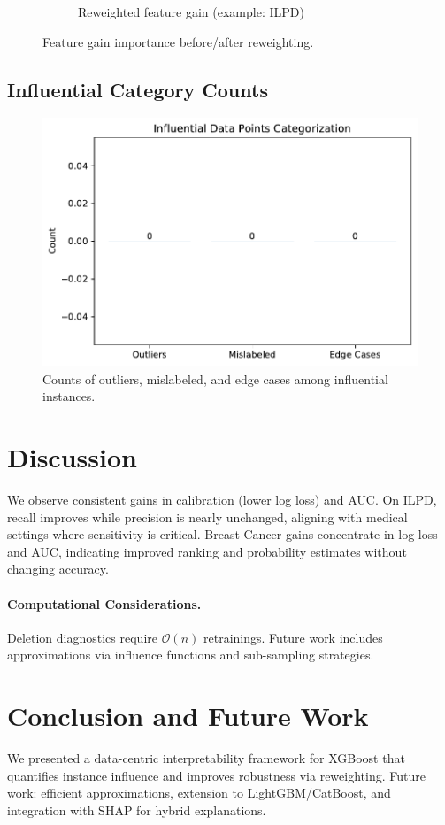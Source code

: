 \documentclass[sn-basic]{sn-jnl} %
\begin{document}
\begin{figure}[H]
\begin{subfigure}{.49\linewidth}
    \caption{Reweighted feature gain (example: ILPD)}
  \end{subfigure}
  \caption{Feature gain importance before/after reweighting.}
  \label{fig:featgain}
\end{figure}

\subsection{Influential Category Counts}
\begin{figure}[H]
  \centering
  \includegraphics[width=.7\linewidth]{fig_category_counts.pdf}
  \caption{Counts of outliers, mislabeled, and edge cases among influential instances.}
  \label{fig:cats}
\end{figure}

\section{Discussion}
We observe consistent gains in calibration (lower log loss) and AUC. On ILPD, recall improves while precision is nearly unchanged, aligning with medical settings where sensitivity is critical. Breast Cancer gains concentrate in log loss and AUC, indicating improved ranking and probability estimates without changing accuracy.

\paragraph{Computational Considerations.} Deletion diagnostics require $\mathcal{O}(n)$ retrainings. Future work includes approximations via influence functions and sub-sampling strategies.

\section{Conclusion and Future Work}
We presented a data-centric interpretability framework for XGBoost that quantifies instance influence and improves robustness via reweighting. Future work: efficient approximations, extension to LightGBM/CatBoost, and integration with SHAP for hybrid explanations.
\end{document}
